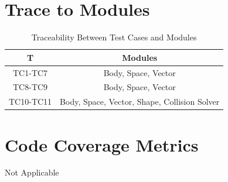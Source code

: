 \documentclass[12pt, titlepage]{article}
\begin{document}
\section{Trace to Modules}	

\begin{table} [h!]
	
	\centering
	
	\begin{tabular}{|c|c|}
		
		\hline	
		
		\textbf{T} & \textbf{Modules}\\
		
		\hline 
		
		TC1-TC7& Body, Space, Vector\\ \hline 
		TC8-TC9& Body, Space, Vector\\ \hline
		TC10-TC11& Body, Space, Vector, Shape, Collision Solver\\ \hline
		\end{tabular}
	
	\caption{Traceability Between Test Cases and Modules}
		
\end{table}	

\section{Code Coverage Metrics}
Not Applicable



\end{document}
